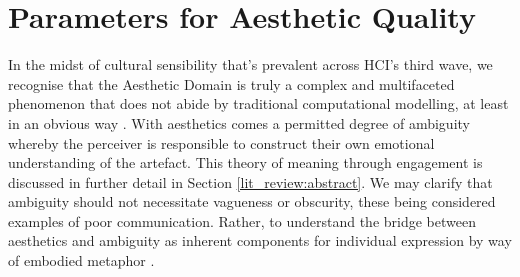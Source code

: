 






\section{Parameters for Aesthetic Quality}
\label{cha:aestheitic_parameters}

In the midst of cultural sensibility that's prevalent across HCI's third wave, we recognise that the Aesthetic Domain is truly a complex and multifaceted phenomenon that does not abide by traditional computational modelling, at least in an obvious way \cite{bardzell_interaction_2009, rentschler_innate_1999}. With aesthetics comes a permitted degree of ambiguity whereby the perceiver is responsible to construct their own emotional understanding of the artefact. This theory of meaning through engagement is discussed in further detail in Section \ref{lit_review:abstract}. We may clarify that ambiguity should not necessitate vagueness or obscurity, these being considered examples of poor communication. Rather, to understand the bridge between aesthetics and ambiguity as inherent components for individual expression by way of embodied metaphor \cite{dauden_roquet_body_2020,lakoff_metaphors_2003}.

